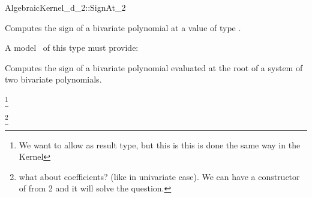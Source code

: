 \begin{ccRefConcept}{AlgebraicKernel_d_2::SignAt_2}

\ccDefinition
Computes the sign of a bivariate polynomial 
 at a value of type 
. 

\ccRefines 
{}


A model \ccVar\ of this type must provide:

{Computes the sign of a bivariate polynomial  evaluated at the root 
 of a system of two bivariate polynomials.} 

\footnote{We want to allow  as result type,
but this is this is done the same way in the Kernel}

\footnote{what about coefficients? (like in univariate case). We can have 
a constructor of  from 2  and it 
will solve the question.}

\end{ccRefConcept}
